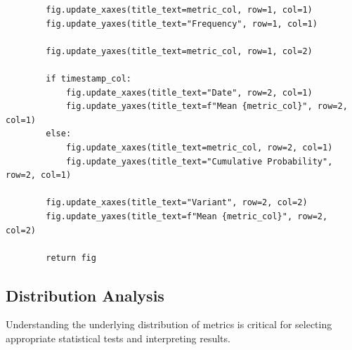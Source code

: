 \begin{lstlisting}
        fig.update_xaxes(title_text=metric_col, row=1, col=1)
        fig.update_yaxes(title_text="Frequency", row=1, col=1)

        fig.update_yaxes(title_text=metric_col, row=1, col=2)

        if timestamp_col:
            fig.update_xaxes(title_text="Date", row=2, col=1)
            fig.update_yaxes(title_text=f"Mean {metric_col}", row=2, col=1)
        else:
            fig.update_xaxes(title_text=metric_col, row=2, col=1)
            fig.update_yaxes(title_text="Cumulative Probability", row=2, col=1)

        fig.update_xaxes(title_text="Variant", row=2, col=2)
        fig.update_yaxes(title_text=f"Mean {metric_col}", row=2, col=2)

        return fig
\end{lstlisting}

\subsection{Distribution Analysis}

Understanding the underlying distribution of metrics is critical for selecting appropriate statistical tests and interpreting results.


